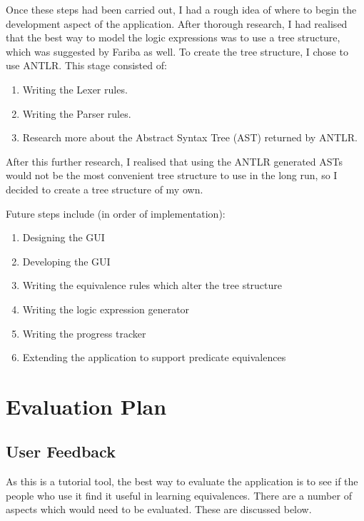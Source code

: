 \documentclass[12pt]{article}
\begin{document}
Once these steps had been carried out, I had a rough idea of where to begin 
the development aspect of the application. After thorough research, I had realised
that the best way to model the logic expressions was to use a tree structure, which
was suggested by Fariba as well. To create the tree structure, I chose to use
ANTLR. This stage consisted of:

\begin{enumerate}
	\item Writing the Lexer rules.
	\item Writing the Parser rules.
	\item Research more about the Abstract Syntax Tree (AST) returned by ANTLR.
\end{enumerate}

After this further research, I realised that using the ANTLR generated ASTs would
not be the most convenient tree structure to use in the long run, so I decided
to create a tree structure of my own.

Future steps include (in order of implementation):
\begin{enumerate}
	\item Designing the GUI
	\item Developing the GUI
	\item Writing the equivalence rules which alter the tree structure
	\item Writing the logic expression generator
	\item Writing the progress tracker
  \item Extending the application to support predicate equivalences
\end{enumerate}
\newpage

\section{Evaluation Plan}
\subsection{User Feedback}
As this is a tutorial tool, the best way to evaluate the application is to see
if the people who use it find it useful in learning equivalences. There are a number
of aspects which would need to be evaluated. These are discussed below.
\end{document}
